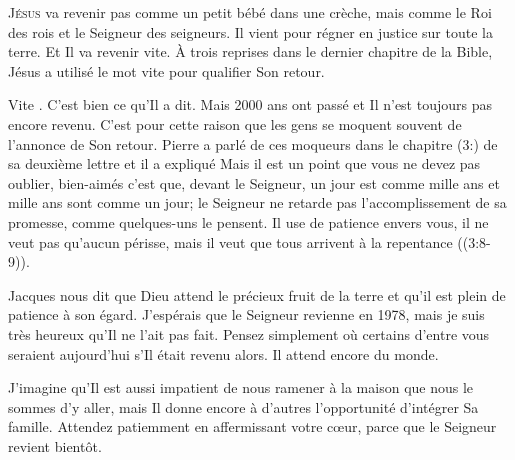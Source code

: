 



\lettrine{J}{ésus} va revenir \ocadr pas comme un petit bébé dans une crèche,
 mais comme le Roi des rois et le Seigneur des seigneurs.
 Il vient pour régner en justice sur toute la terre. Et Il va revenir vite.
 À trois reprises dans le dernier chapitre de la Bible, Jésus a utilisé le mot
 \Og vite \Fg{} pour qualifier Son retour.

\Og Vite \Fg{}. C'est bien ce qu'Il a dit.
 Mais 2000 ans ont passé et Il n'est toujours pas encore revenu.
 C'est pour cette raison que les gens se moquent souvent de l'annonce
 de Son retour. Pierre a parlé de ces moqueurs dans le chapitre
 (3:)
 de sa deuxième lettre et il a expliqué\frcolon{}
 \Og Mais il est un point que vous ne devez pas oublier, bien-aimés\frcolon{}
 c'est que, devant le Seigneur, un jour est comme mille ans et mille ans
 sont comme un jour; le Seigneur ne retarde pas l'accomplissement
 de sa promesse, comme quelques-uns le pensent.
 Il use de patience envers vous, il ne veut pas qu'aucun périsse,
 mais il veut que tous arrivent à la repentance \Fg{}
 ((3:8-9)).


Jacques nous dit que Dieu attend le précieux fruit de la terre
 et qu'il est plein de patience à son égard.
 J'espérais que le Seigneur revienne en 1978, mais je suis très heureux
 qu'Il ne l'ait pas fait. Pensez simplement où certains d'entre vous seraient
 aujourd'hui s'Il était revenu alors. Il attend encore du monde.

J'imagine qu'Il est aussi impatient de nous ramener à la maison
 que nous le sommes d'y aller, mais Il donne encore à d'autres l'opportunité
 d'intégrer Sa famille. Attendez patiemment en affermissant votre c\oe{}ur,
 parce que le Seigneur revient bientôt.

\dvrule




